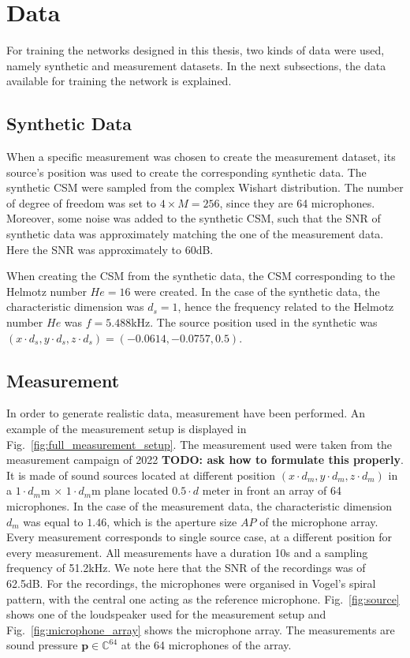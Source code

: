 \documentclass[11pt,a4paper,twoside]{report}
\begin{document}
\section{Data}

For training the networks designed in this thesis, two kinds of data were used, namely synthetic and measurement datasets. In the next subsections, the data available for training the network is explained. 

\subsection{Synthetic Data}

When a specific measurement was chosen to create the measurement dataset, its source's position was used to create the corresponding synthetic data. The synthetic CSM were sampled from the complex Wishart distribution. The number of degree of freedom was set to $4 \times M = 256$, since they are 64 microphones. Moreover, some noise was added to the synthetic CSM, such that the SNR of synthetic data was approximately matching the one of the measurement data. Here the SNR was approximately to 60dB. 

When creating the CSM from the synthetic data, the CSM corresponding to the Helmotz number $He = 16$ were created. In the case of the synthetic data, the characteristic dimension was $d_s = 1$, hence the frequency related to the Helmotz number $He$ was $f = 5.488$kHz. The source position used in the synthetic was $(x \cdot d_s,y \cdot d_s, z \cdot d_s) = (-0.0614,-0.0757, 0.5)$.

\subsection{Measurement}

In order to generate realistic data, measurement have been performed. An example of the measurement setup is displayed in Fig.~\ref{fig:full_measurement_setup}. The measurement used were taken from the measurement campaign of 2022 \textbf{TODO: ask how to formulate this properly}. It is made of sound sources located at different position $(x \cdot d_m,y \cdot d_m, z \cdot d_m)$ in a $1 \cdot d_m$m $\times$ $1 \cdot d_m$m plane located $0.5 \cdot d$ meter in front an array of 64 microphones. In the case of the measurement data, the characteristic dimension $d_m$ was equal to $1.46$, which is the aperture size $AP$ of the microphone array. Every measurement corresponds to single source case, at a different position for every measurement. All measurements have a duration 10s and a sampling frequency of 51.2kHz. We note here that the SNR of the recordings was of 62.5dB. For the recordings, the microphones were organised in Vogel's spiral pattern, with the central one acting as the reference microphone.  Fig.~\ref{fig:source} shows one of the loudspeaker used  for the measurement setup and Fig.~\ref{fig:microphone_array} shows the microphone array. The measurements are sound pressure $\mathbf{p} \in \mathbb{C}^{64}$ at the 64 microphones of the array.
\end{document}
